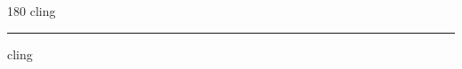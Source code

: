 
\begin{frame}
\begin{center}
\begin{turn}{180}
{\fontsize{2.5cm}{1em}\selectfont cling}
\end{turn}
\vspace{1em}\par  
\hrule
\vspace{1em}\par  
{\fontsize{2.5cm}{1em}\selectfont cling}
\end{center}
\end{frame}
